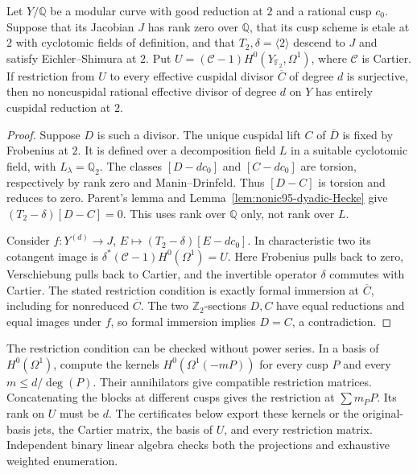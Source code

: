 \begin{lemma}\label{lem:nonic63-quotient-Cartier}
Let $Y/\mathbb Q$ be a modular curve with good reduction at $2$ and a
rational cusp $c_0$. Suppose that its Jacobian $J$ has rank zero
over $\mathbb Q$, that its cusp scheme is etale at $2$ with cyclotomic
fields of definition, and that $T_2,\delta=\langle2\rangle$ descend
to $J$ and satisfy Eichler--Shimura at $2$.
Put $U=(\mathcal C-1)H^0(Y_{\mathbb F_2},\Omega^1)$, where $\mathcal C$
is Cartier. If restriction from $U$ to every effective cuspidal
divisor $\overline C$ of degree $d$ is surjective, then no
noncuspidal rational effective divisor of degree $d$ on $Y$
has entirely cuspidal reduction at $2$.
\end{lemma}
\begin{proof}
Suppose $D$ is such a divisor. The unique cuspidal lift $C$ of
$\overline D$ is fixed by Frobenius at $2$. It is defined over a
decomposition field $L$ in a suitable cyclotomic field, with
$L_\lambda=\mathbb Q_2$. The classes $[D-dc_0]$ and $[C-dc_0]$ are
torsion, respectively by rank zero and Manin--Drinfeld.
Thus $[D-C]$ is torsion and reduces to zero. Parent's lemma and
Lemma~\ref{lem:nonic95-dyadic-Hecke} give
$(T_2-\delta)[D-C]=0$.
This uses rank over $\mathbb Q$ only, not rank over $L$.

Consider $f:Y^{(d)}\to J$, $E\mapsto(T_2-\delta)[E-dc_0]$.
In characteristic two its cotangent image is
$\delta^*(\mathcal C-1)H^0(\Omega^1)=U$.
Here Frobenius pulls back to zero, Verschiebung pulls back to
Cartier, and the invertible operator $\delta$ commutes with Cartier.
The stated restriction condition is exactly formal immersion at
$\overline C$, including for nonreduced $\overline C$.
The two $\mathbb Z_2$-sections $D,C$ have equal reductions and equal
images under $f$, so formal immersion implies $D=C$, a contradiction.
\end{proof}

The restriction condition can be checked without power series.
In a basis of $H^0(\Omega^1)$, compute the kernels
$H^0(\Omega^1(-mP))$ for every cusp $P$ and every
$m\leq d/\deg(P)$. Their annihilators give compatible restriction
matrices. Concatenating the blocks at different cusps gives the
restriction at $\sum m_P P$. Its rank on $U$ must be $d$.
The certificates below export these kernels or the original-basis
jets, the Cartier matrix, the basis of $U$, and every restriction
matrix. Independent binary linear algebra checks both the
projections and exhaustive weighted enumeration.
